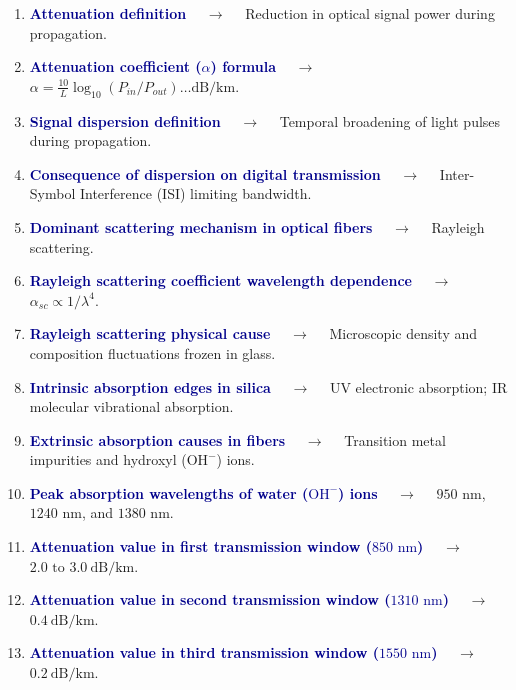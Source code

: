 \documentclass[11pt,a4paper]{article}
\begin{document}
\begin{enumerate}[label=\arabic*., leftmargin=*, labelsep=0.8em, itemsep=0.35em, parsep=0.1em, topsep=0.2em]
  \item \textcolor{darkblue}{\textbf{Attenuation definition}} $\quad\to\quad$ Reduction in optical signal power during propagation.
  \item \textcolor{darkblue}{\textbf{Attenuation coefficient ($\alpha$) formula}} $\quad\to\quad$ $\alpha = \frac{10}{L} \log_{10}(P_{in}/P_{out})\dots\text{dB/km}$.
  \item \textcolor{darkblue}{\textbf{Signal dispersion definition}} $\quad\to\quad$ Temporal broadening of light pulses during propagation.
  \item \textcolor{darkblue}{\textbf{Consequence of dispersion on digital transmission}} $\quad\to\quad$ Inter-Symbol Interference (ISI) limiting bandwidth.
  \item \textcolor{darkblue}{\textbf{Dominant scattering mechanism in optical fibers}} $\quad\to\quad$ Rayleigh scattering.
  \item \textcolor{darkblue}{\textbf{Rayleigh scattering coefficient wavelength dependence}} $\quad\to\quad$ $\alpha_{sc} \propto 1/\lambda^4$.
  \item \textcolor{darkblue}{\textbf{Rayleigh scattering physical cause}} $\quad\to\quad$ Microscopic density and composition fluctuations frozen in glass.
  \item \textcolor{darkblue}{\textbf{Intrinsic absorption edges in silica}} $\quad\to\quad$ UV electronic absorption; IR molecular vibrational absorption.
  \item \textcolor{darkblue}{\textbf{Extrinsic absorption causes in fibers}} $\quad\to\quad$ Transition metal impurities and hydroxyl ($\text{OH}^-$) ions.
  \item \textcolor{darkblue}{\textbf{Peak absorption wavelengths of water ($\text{OH}^-$) ions}} $\quad\to\quad$ $950\text{ nm}$, $1240\text{ nm}$, and $1380\text{ nm}$.
  \item \textcolor{darkblue}{\textbf{Attenuation value in first transmission window ($850\text{ nm}$)}} $\quad\to\quad$ $2.0 \text{ to } 3.0\ \text{dB/km}$.
  \item \textcolor{darkblue}{\textbf{Attenuation value in second transmission window ($1310\text{ nm}$)}} $\quad\to\quad$ $0.4\ \text{dB/km}$.
  \item \textcolor{darkblue}{\textbf{Attenuation value in third transmission window ($1550\text{ nm}$)}} $\quad\to\quad$ $0.2\ \text{dB/km}$.

\end{enumerate}
\end{document}
